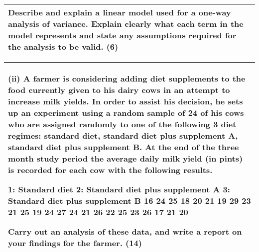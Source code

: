 \documentclass[a4paper,12pt]{article}
\begin{document}
  \begin{table}[ht!]
     \centering
     \begin{tabular}{|p{15cm}|}
     \hline        
Describe and explain a linear model used for a one-way analysis of variance.  Explain clearly what each term in the model represents and state any assumptions required for the analysis to be valid. (6) 
 

 
 \\ \hline
      \end{tabular}
    \end{table}
    
  \begin{table}[ht!]
     \centering
     \begin{tabular}{|p{15cm}|}
     \hline  
 (ii) A farmer is considering adding diet supplements to the food currently given to his dairy cows in an attempt to increase milk yields.  In order to assist his decision, he sets up an experiment using a random sample of 24 of his cows who are assigned randomly to one of the following 3 diet regimes: standard diet, standard diet plus supplement A, standard diet plus supplement B.  At the end of the three month study period the average daily milk yield (in pints) is recorded for each cow with the following results. 
 
  
1:  Standard diet 
2:  Standard diet plus supplement A 
3:  Standard diet plus supplement B 16 24 25 18 20 21 19 29 23 21 25 19 24 27 24 21 26 22 25 23 26 17 21 20 
 
 
Carry out an analysis of these data, and write a report on your findings for the farmer. (14)  \\ \hline 
      \end{tabular}
    \end{table}

        
\end{document}
